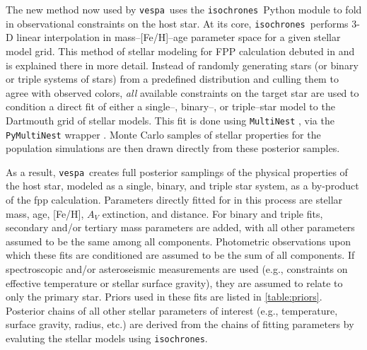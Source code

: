 \documentclass[preprint2]{aastex}
\newcommand{\vespa}{\texttt{vespa}}
\newcommand{\isochrones}{\texttt{isochrones}}
\begin{document}
The new method now used by \vespa\ uses the \isochrones\ Python module
\citep{isochrones} to fold in observational constraints on the host
star.  At its core, \isochrones\ performs 3-D linear interpolation in
mass--[Fe/H]--age parameter space for a given stellar model grid.
This method of stellar modeling for FPP calculation debuted in
\citet{Montet:2015} and is explained there in more detail.  Instead of
randomly generating stars (or binary or triple systems of stars) from
a predefined distribution and culling them to agree with observed
colors, \emph{all} available constraints on the target star are used
to condition a direct fit of either a single--, binary--, or
triple--star model to the Dartmouth grid of stellar models.  This fit
is done using \texttt{MultiNest} \citep{Feroz:2009, Feroz:2011,
  Feroz:2013}, via the \texttt{PyMultiNest} wrapper
\citep{Buchner:2014}.  Monte Carlo samples of stellar properties for
the population simulations are then drawn directly from these
posterior samples.

As a result, \vespa\ creates full posterior samplings of the physical
properties of the host star, modeled as a single, binary, and triple
star system, as a by-product of the \ac{fpp} calculation.  Parameters
directly fitted for in this process are stellar mass, age, [Fe/H],
$A_V$ extinction, and distance.  For binary and triple fits, secondary
and/or tertiary mass parameters are added, with all other parameters
assumed to be the same among all components.  Photometric observations
upon which these fits are conditioned are assumed to be the sum of all
components.  If spectroscopic and/or asteroseismic measurements are
used (e.g., constraints on effective temperature or stellar surface
gravity), they are assumed to relate to only the primary star.  Priors
used in these fits are listed in \autoref{table:priors}.  Posterior
chains of all other stellar parameters of interest (e.g., temperature,
surface gravity, radius, etc.) are derived from the chains of fitting
parameters by evaluting the stellar models using \isochrones.
\end{document}
